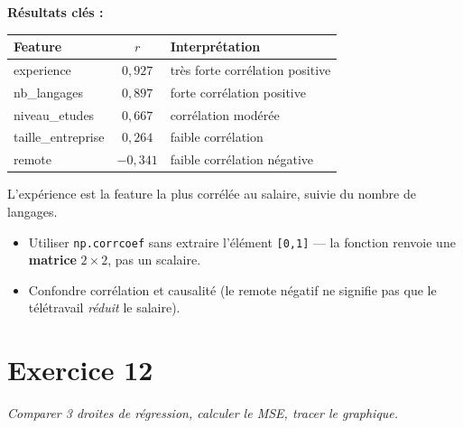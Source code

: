 \textbf{R\'{e}sultats cl\'{e}s :}
\begin{center}
\begin{tabular}{l c l}
    \toprule
    \textbf{Feature} & $r$ & \textbf{Interpr\'{e}tation} \\
    \midrule
    experience        & $0{,}927$ & tr\`{e}s forte corr\'{e}lation positive \\
    nb\_langages      & $0{,}897$ & forte corr\'{e}lation positive \\
    niveau\_etudes    & $0{,}667$ & corr\'{e}lation mod\'{e}r\'{e}e \\
    taille\_entreprise & $0{,}264$ & faible corr\'{e}lation \\
    remote            & $-0{,}341$ & faible corr\'{e}lation n\'{e}gative \\
    \bottomrule
\end{tabular}
\end{center}

L'exp\'{e}rience est la feature la plus corr\'{e}l\'{e}e au salaire, suivie du nombre de langages.

\begin{attentionbox}
    \begin{itemize}
        \item Utiliser \texttt{np.corrcoef} sans extraire l'\'{e}l\'{e}ment \texttt{[0,1]} --- la fonction renvoie une \textbf{matrice} $2 \times 2$, pas un scalaire.
        \item Confondre corr\'{e}lation et causalit\'{e} (le remote n\'{e}gatif ne signifie pas que le t\'{e}l\'{e}travail \textit{r\'{e}duit} le salaire).
    \end{itemize}
\end{attentionbox}

\section*{Exercice 12 \hfill \exoavance}
\textit{Comparer 3 droites de r\'{e}gression, calculer le MSE, tracer le graphique.}

\separateur


